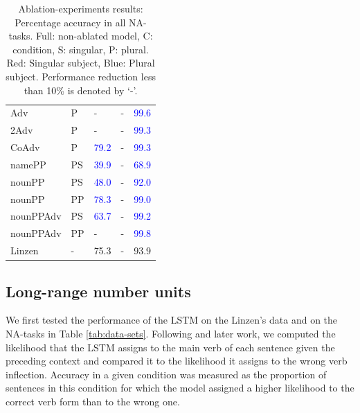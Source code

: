\begin{center}
\begin{table}[t]
\begin{tabular}{|P{2.3cm}|P{0.4cm}||P{0.6cm}|P{0.6cm}|P{0.6cm}|}
Adv & P &  - &  - &  \textcolor{blue}{99.6} \\

2Adv & P & - &  - &   \textcolor{blue}{99.3} \\

CoAdv & P &  \textcolor{blue}{79.2} &  - &   \textcolor{blue}{99.3} \\

namePP & PS & \textcolor{blue}{39.9} &  - &   \textcolor{blue}{68.9} \\

nounPP & PS &  \textcolor{blue}{48.0} & - &   \textcolor{blue}{92.0} \\

nounPP & PP &  \textcolor{blue}{78.3} & - &   \textcolor{blue}{99.0} \\

nounPPAdv & PS & \textcolor{blue}{63.7} &  - &   \textcolor{blue}{99.2} \\

nounPPAdv & PP & - &  - &   \textcolor{blue}{99.8} \\

\hline

\B Linzen & \B - &   75.3 &  - &  93.9 \\
\hline

\end{tabular}
\caption{Ablation-experiments results: Percentage accuracy in all NA-tasks. Full: non-ablated model, C: condition, S: singular, P: plural. Red: Singular subject, Blue: Plural subject. Performance reduction less than 10\% is denoted by `-'.  \label{tab:ablation-results}}
\end{table}
\end{center}

\subsection{Long-range number units}\label{subsec:ablation}
We first tested the performance of the LSTM on the Linzen's data and on the NA-tasks in Table
\ref{tab:data-sets}. Following
 and later work, we computed the likelihood
that the LSTM assigns to the main verb of each sentence given the
preceding context and compared it to the likelihood it assigns to the
wrong verb inflection. Accuracy in a given condition was measured as the proportion of sentences in this condition for which the model assigned a higher likelihood to the correct verb form than to the wrong one.

